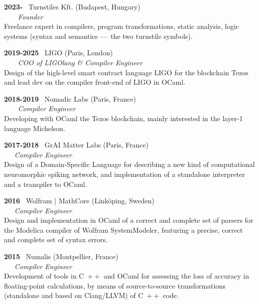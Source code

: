 \documentclass[a4paper,11pt]{article}
\newcommand{\cpp}{\mbox{C \hspace*{-2.5mm} \raise 0.7mm \hbox{${\scriptscriptstyle ++}$}}}
\begin{document}
\noindent\textbf{2023-} \ \textsf{Turnstiles Kft.} (Budapest,
Hungary)\\ \ \ \ \ \emph{Founder}\\
Freelance expert in compilers, program transformations, static
analysis, logic systems (syntax and semantics ---~the two turnstile
symbols).

\bigskip

\noindent\textbf{2019-2025} \ \textsf{LIGO} (Paris,
London)\\ \ \ \ \ \emph{COO of LIGOlang \& Compiler Engineer}\\ Design
of the high-level smart contract language LIGO for the blockchain
Tezos and lead dev on the compiler front-end of LIGO in OCaml.

\bigskip

\noindent\textbf{2018-2019} \ \textsf{Nomadic Labs} (Paris,
France)\\ \ \ \ \ \emph{Compiler Engineer}\\ Developing with OCaml the
Tezos blockchain, mainly interested in the \mbox{layer-1} language
Michelson.

\bigskip

\noindent\textbf{2017-2018} \ \textsf{GrAI Matter Labs} (Paris,
France)\\ \ \ \ \emph{Compiler Engineer}\\ Design of a Domain-Specific
Language for describing a new kind of computational
neuromorphic spiking network, and implementation of a standalone
interpreter and a transpiler to OCaml.

\newpage

\noindent\textbf{2016} \ \textsf{Wolfram | MathCore}
(Link\"oping, Sweden)\\ \ \ \ \emph{Compiler Engineer}\\ Design and
implementation in OCaml of a correct and complete set of parsers
for the Modelica compiler of Wolfram SystemModeler, featuring a
precise, correct and complete set of syntax errors.

\bigskip

\noindent\textbf{2015} \ \textsf{Numalis} (Montpellier,
France)\\ \ \ \ \emph{Compiler Engineer}\\ Development of tools in
\cpp{} and OCaml for assessing the loss of accuracy in floating-point
calculations, by means of source-to-source transformations (standalone
and based on Clang/LLVM) of \cpp{} code.

\bigskip
\end{document}
